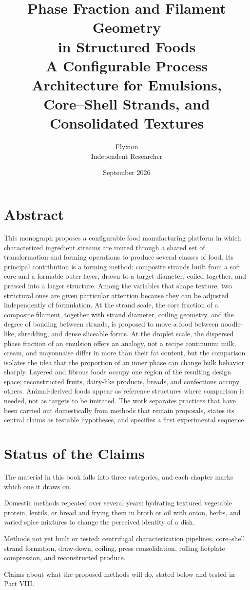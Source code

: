 \documentclass[11pt,openany]{book}
\title{\textbf{Phase Fraction and Filament Geometry\\in Structured Foods}\\[1em]
\large A Configurable Process Architecture for Emulsions,\\Core--Shell Strands, and Consolidated Textures}
\author{Flyxion\\Independent Researcher}
\date{September 2026}
\theoremstyle{definition}
\begin{document}
\frontmatter
\maketitle

\chapter*{Abstract}

This monograph proposes a configurable food manufacturing platform in which characterized ingredient streams are routed through a shared set of transformation and forming operations to produce several classes of food. Its principal contribution is a forming method: composite strands built from a soft core and a formable outer layer, drawn to a target diameter, coiled together, and pressed into a larger structure. Among the variables that shape texture, two structural ones are given particular attention because they can be adjusted independently of formulation. At the strand scale, the core fraction of a composite filament, together with strand diameter, coiling geometry, and the degree of bonding between strands, is proposed to move a food between noodle-like, shredding, and dense sliceable forms. At the droplet scale, the dispersed phase fraction of an emulsion offers an analogy, not a recipe continuum: milk, cream, and mayonnaise differ in more than their fat content, but the comparison isolates the idea that the proportion of an inner phase can change bulk behavior sharply. Layered and fibrous foods occupy one region of the resulting design space; reconstructed fruits, dairy-like products, breads, and confections occupy others. Animal-derived foods appear as reference structures where comparison is needed, not as targets to be imitated. The work separates practices that have been carried out domestically from methods that remain proposals, states its central claims as testable hypotheses, and specifies a first experimental sequence.

\chapter*{Status of the Claims}

The material in this book falls into three categories, and each chapter marks which one it draws on.

\begin{description}[leftmargin=1.5em]
\item[Practiced.] Domestic methods repeated over several years: hydrating textured vegetable protein, lentils, or bread and frying them in broth or oil with onion, herbs, and varied spice mixtures to change the perceived identity of a dish.
\item[Proposed.] Methods not yet built or tested: centrifugal characterization pipelines, core--shell strand formation, draw-down, coiling, press consolidation, rolling hotplate compression, and reconstructed produce.
\item[Hypothesized.] Claims about what the proposed methods will do, stated below and tested in Part VIII.
\end{description}
\end{document}
